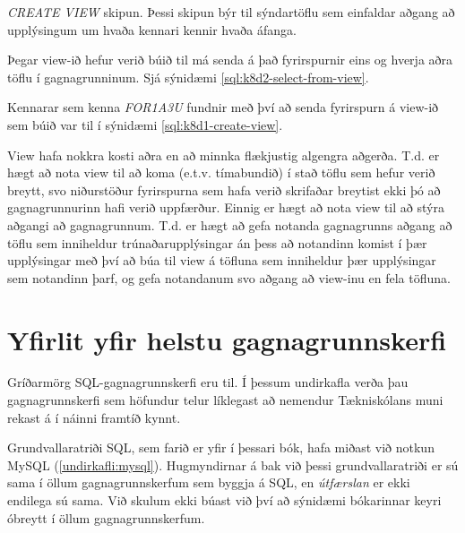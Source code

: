 \begin{example}
\caption[View]{\emph{CREATE VIEW} skipun. Þessi skipun býr til sýndartöflu sem einfaldar aðgang að upplýsingum um hvaða kennari kennir hvaða áfanga.}
\label{sql:k8d1-create-view}
\centering
{}
\end{example}

Þegar view-ið hefur verið búið til má senda á það fyrirspurnir eins og hverja aðra töflu í gagnagrunninum. Sjá sýnidæmi \ref{sql:k8d2-select-from-view}.

\begin{example}
\caption[SELECT úr view]{Kennarar sem kenna \emph{FOR1A3U} fundnir með því að senda fyrirspurn á view-ið sem búið var til í sýnidæmi \ref{sql:k8d1-create-view}. }
\label{sql:k8d2-select-from-view}
\centering
{}
\end{example}

View hafa nokkra kosti aðra en að minnka flækjustig algengra aðgerða. T.d. er hægt að nota view til að koma (e.t.v. tímabundið) í stað töflu sem hefur verið breytt, svo niðurstöður fyrirspurna sem hafa verið skrifaðar breytist ekki þó að gagnagrunnurinn hafi verið uppfærður. Einnig er hægt að nota view til að stýra aðgangi að gagnagrunnum. T.d. er hægt að gefa notanda gagnagrunns aðgang að töflu sem inniheldur trúnaðarupplýsingar án þess að notandinn komist í þær upplýsingar með því að búa til view á töfluna sem inniheldur þær upplýsingar sem notandinn þarf, og gefa notandanum svo aðgang að view-inu en fela töfluna.
\section{Yfirlit yfir helstu gagnagrunnskerfi}
\label{undirkafli:helstu-gagnagrunnskerfi}
Gríðarmörg SQL-gagnagrunnskerfi eru til. Í þessum undirkafla verða þau gagnagrunnskerfi sem höfundur telur líklegast að nemendur Tækniskólans muni rekast á í náinni framtíð kynnt.

Grundvallaratriði SQL, sem farið er yfir í þessari bók, hafa miðast við notkun MySQL (\ref{undirkafli:mysql}). Hugmyndirnar á bak við þessi grundvallaratriði er sú sama í öllum gagnagrunnskerfum sem byggja á SQL, en \emph{útfærslan} er ekki endilega sú sama. Við skulum ekki búast við því að sýnidæmi bókarinnar keyri óbreytt í öllum gagnagrunnskerfum.
